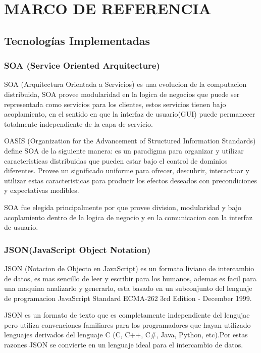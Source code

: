 \section{MARCO DE REFERENCIA}

\subsection{Tecnologías Implementadas}

\subsubsection*{SOA (Service Oriented Arquitecture)}

SOA (Arquitectura Orientada a Servicios) es una evolucion de la computacion distribuida, SOA provee modularidad en la logica de negocios que puede ser representada como servicios para los clientes, estos servicios tienen bajo acoplamiento, en el sentido en que la interfaz de usuario(GUI) puede permanecer totalmente independiente de la capa de servicio.

OASIS (Organization for the Advancement of Structured Information Standards) define SOA de la siguiente manera: es un paradigma para organizar y utilizar caracteristicas distribuidas que pueden estar bajo el control de dominios diferentes. Provee un significado uniforme para ofrecer, descubrir, interactuar y utilizar estas caracteristicas para producir los efectos deseados con precondiciones y expectativas medibles.

SOA fue elegida principalmente por que provee division, modularidad y bajo acoplamiento dentro de la logica de negocio y en la comunicacion con la interfaz de usuario.


\subsubsection*{JSON(JavaScript Object Notation) \cite{json} }

JSON (Notacion de Objecto en JavaScript) es un formato liviano de intercambio de datos, es mas sencillo de leer y escribir para los humanos, ademas es facil para una maquina analizarlo y generarlo, esta basado en un subconjunto del lenguaje de programacion JavaScript Standard ECMA-262 3rd Edition - December 1999.

JSON es un formato de texto que es completamente independiente del lengujae pero utiliza convenciones familiares para los programadores que hayan utilizado lenguajes derivados del lenguaje C (C, C++, C\#, Java, Python, etc).\newline Por estas razones JSON se convierte en un lenguaje ideal para el intercambio de datos.

